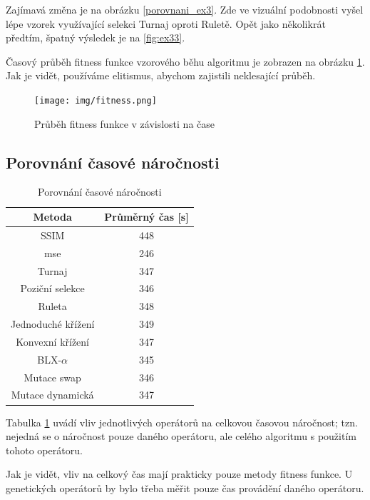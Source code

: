 \documentclass[a4paper,11pt,titlepage]{scrartcl}
\begin{document}
Zajímavá změna je na obrázku \ref{porovnani_ex3}. Zde ve vizuální podobnosti vyšel lépe vzorek využívající selekci Turnaj oproti Ruletě. Opět jako několikrát předtím, špatný výsledek je na \ref{fig:ex33}.

Časový průběh fitness funkce vzorového běhu algoritmu je zobrazen na obrázku \ref{fitness_t}. Jak je vidět, používáme elitismus, abychom zajistili neklesající průběh.

\begin{figure}[h!]
    \caption{Průběh fitness funkce v závislosti na čase}
    \label{fitness_t}
    \centering
    \texttt{[image: img/fitness.png]}
\end{figure}

\subsection{Porovnání časové náročnosti}

\begin{table}[h!]
  \caption{Porovnání časové náročnosti}
  \label{tab:por}

  \begin{center}
    \begin{tabular}{|c|c|}
    \hline
       Metoda & Průměrný čas [s] \\
       \hline
       SSIM & 448 \\
        mse &
        246 \\
        Turnaj &
        347 \\
        Poziční selekce &
        346 \\
        Ruleta &
        348 \\
        Jednoduché křížení &
        349 \\
        Konvexní křížení &
        347 \\
        BLX-$\alpha$ &
        345 \\
        Mutace swap &
        346 \\
        Mutace dynamická &
        347 \\
        \hline
    \end{tabular}
  \end{center}
\end{table}

Tabulka \ref{tab:por} uvádí vliv jednotlivých operátorů na celkovou časovou náročnost; tzn. nejedná se o náročnost pouze daného operátoru, ale celého algoritmu s použitím tohoto operátoru.

Jak je vidět, vliv na celkový čas mají prakticky pouze metody fitness funkce. U genetických operátorů by bylo třeba měřit pouze čas provádění daného operátoru.
\end{document}
